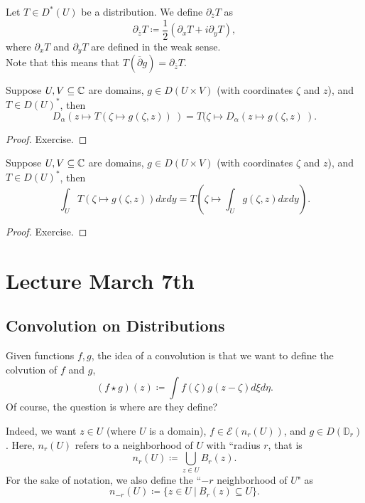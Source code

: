 \documentclass{article}
\begin{document}
{\begin{example}
    Let $T \in D^*(U)$ be a distribution. We define $\partial_{\overline{z}} T$ as
    \[\partial_{\overline{z}} T \coloneqq \frac{1}{2} (\partial_x T + i \partial_y T),\]
    where $\partial_x T$ and $\partial_y T$ are defined in the weak sense.\\

    Note that this means that $T(\overline{\partial} g) = \partial_{\overline{z}} T$.
\end{example}


\begin{theorem}
    Suppose $U, V \subseteq \mathbb{C}$ are domains, $g \in D(U \times V)$ (with coordinates $\zeta$ and $z$), and $T \in D(U)^*$, then
    \[D_\alpha(z \mapsto T(\zeta \mapsto g(\zeta, z))\ ) = T(\zeta \mapsto D_\alpha (z \mapsto g(\zeta, z)\ ). \]
\end{theorem}

\begin{proof}
    Exercise.
\end{proof}

\begin{theorem}
    Suppose $U, V \subseteq \mathbb{C}$ are domains, $g \in D(U \times V)$ (with coordinates $\zeta$ and $z$), and $T \in D(U)^*$, then
    \[\int_{U} T(\zeta \mapsto g(\zeta, z)) dx dy = T(\zeta \mapsto \int_{U} g(\zeta, z) dx dy).\]
\end{theorem}

\begin{proof}
    Exercise.
\end{proof}

\newpage
\section{Lecture March 7th}

\subsection{Convolution on Distributions}

Given functions $f, g$, the idea of a convolution is that we want to define the colvution of $f$ and $g$,
\[(f \star g)(z) \coloneqq \int f(\zeta) g(z - \zeta) d\xi d\eta.\]
Of course, the question is where are they define?

Indeed, we want $z \in U$ (where $U$ is a domain), $f \in \mathcal{E}(n_r(U))$, and $g \in D(\mathbb{D}_r)$. Here, $n_r(U)$ refers to a neighborhood of $U$ with ``radius $r$, that is
\[n_r(U) \coloneqq \bigcup_{z \in U} B_r(z).\]
For the sake of notation, we also define the ``$-r$ neighborhood of $U$" as
\[n_{-r}(U) \coloneqq \{z \in U\ |\ B_r(z) \subseteq U\}.\]

}
\end{document}
